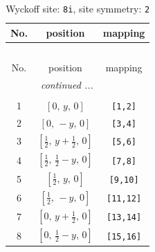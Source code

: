 \documentclass[fleqn,8pt]{jsarticle}
\begin{document}
\renewcommand{\arraystretch}{1.2}
\begin{longtable}{ccc}
\caption{Wyckoff site: {\tt 8i}, site symmetry: {\tt 2}}
 \\
 \hline \hline
No. & position & mapping \\ \hline \endfirsthead

\multicolumn{2}{l}{\tablename\ \thetable{}} \\
 \hline \hline
No. & position & mapping \\ \hline \endhead

 \hline \hline
\multicolumn{2}{r}{\footnotesize\it continued ...} \\ \endfoot

 \hline \hline
\multicolumn{2}{r}{} \\ \endlastfoot

1 & $\left[ 0,\, y,\, 0 \right]$ & {\tt [1,2]} \\ \hline
2 & $\left[ 0,\, - y,\, 0 \right]$ & {\tt [3,4]} \\ \hline
3 & $\left[ \frac{1}{2},\, y + \frac{1}{2},\, 0 \right]$ & {\tt [5,6]} \\ \hline
4 & $\left[ \frac{1}{2},\, \frac{1}{2} - y,\, 0 \right]$ & {\tt [7,8]} \\ \hline
5 & $\left[ \frac{1}{2},\, y,\, 0 \right]$ & {\tt [9,10]} \\ \hline
6 & $\left[ \frac{1}{2},\, - y,\, 0 \right]$ & {\tt [11,12]} \\ \hline
7 & $\left[ 0,\, y + \frac{1}{2},\, 0 \right]$ & {\tt [13,14]} \\ \hline
8 & $\left[ 0,\, \frac{1}{2} - y,\, 0 \right]$ & {\tt [15,16]} \\
\end{longtable}
\renewcommand{\arraystretch}{1.2}
\end{document}
